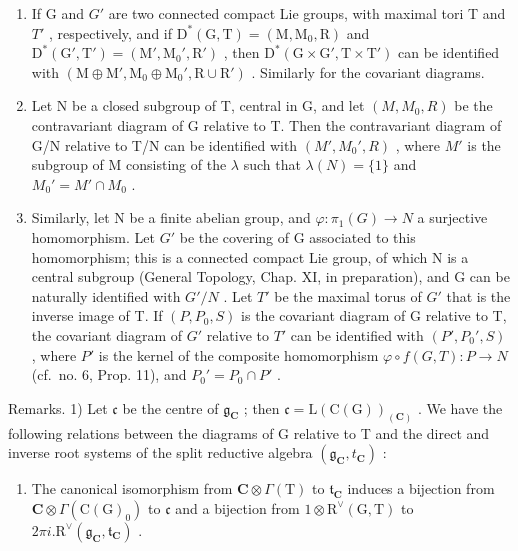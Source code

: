 \begin{enumerate}
\def\labelenumi{\arabic{enumi})}
\setcounter{enumi}{1}
\item
  If G and \(G'\) are two connected compact Lie groups, with maximal tori T and \(T'\) , respectively, and if \(\mathrm{D}^{*}(\mathrm{G},\mathrm{T})=(\mathrm{M},\mathrm{M}_{0},\mathrm{R})\) and \(\mathrm{D}^{*}(\mathrm{G}',\mathrm{T}')=(\mathrm{M}',\mathrm{M}_{0}',\mathrm{R}')\) , then \(\mathrm{D}^{*}(\mathrm{G}\times\mathrm{G}',\mathrm{T}\times\mathrm{T}')\) can be identified with \((\mathrm{M}\oplus\mathrm{M}',\mathrm{M}_{0}\oplus\mathrm{M}_{0}',\mathrm{R}\cup\mathrm{R}')\) . Similarly for the covariant diagrams.
\item
  Let N be a closed subgroup of T, central in G, and let \((M, M_{0}, R)\) be the contravariant diagram of G relative to T. Then the contravariant diagram of G/N relative to T/N can be identified with \((M', M_{0}', R)\) , where \(M'\) is the subgroup of M consisting of the \(\lambda\) such that \(\lambda(N) = \{1\}\) and \(M_{0}' = M' \cap M_{0}\) .
\item
  Similarly, let N be a finite abelian group, and \(\varphi : \pi_{1}(G) \to N\) a surjective homomorphism. Let \(G'\) be the covering of G associated to this homomorphism; this is a connected compact Lie group, of which N is a central subgroup (General Topology, Chap. XI, in preparation), and G can be naturally identified with \(G'/N\) . Let \(T'\) be the maximal torus of \(G'\) that is the inverse image of T. If \((P, P_{0}, S)\) is the covariant diagram of G relative to T, the covariant diagram of \(G'\) relative to \(T'\) can be identified with \((P', P_{0}', S)\) , where \(P'\) is the kernel of the composite homomorphism \(\varphi \circ f(G, T) : P \to N\) (cf.~no. 6, Prop. 11), and \(P_{0}' = P_{0} \cap P'\) .
\end{enumerate}

Remarks. 1) Let \(\mathfrak{c}\) be the centre of \(\mathfrak{g}_{\mathbf{C}}\) ; then \(\mathfrak{c} = \mathrm{L}(\mathrm{C}(\mathrm{G}))_{(\mathbf{C})}\) . We have the following relations between the diagrams of G relative to T and the direct and inverse root systems of the split reductive algebra \((\mathfrak{g}_{\mathbf{C}}, t_{\mathbf{C}})\) :

\begin{enumerate}
\def\labelenumi{\alph{enumi})}
\tightlist
\item
  The canonical isomorphism from \(\mathbf{C} \otimes \Gamma(\mathrm{T})\) to \(\mathfrak{t}_{\mathbf{C}}\) induces a bijection from \(\mathbf{C} \otimes \Gamma(\mathrm{C}(\mathrm{G})_0)\) to \(\mathfrak{c}\) and a bijection from \(1 \otimes \mathrm{R}^{\vee}(\mathrm{G}, \mathrm{T})\) to \(2\pi i.\mathrm{R}^{\vee}(\mathfrak{g}_{\mathbf{C}}, \mathfrak{t}_{\mathbf{C}})\) .
\end{enumerate}

